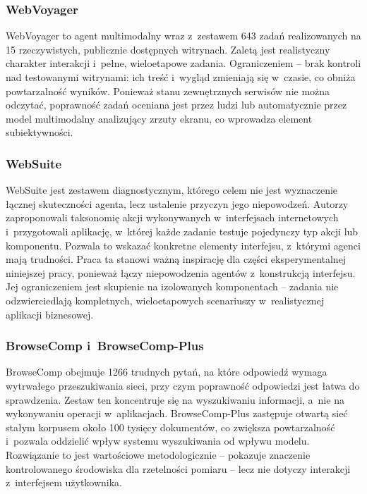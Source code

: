 \subsubsection{WebVoyager}
WebVoyager \citep{he2024webvoyager} to agent multimodalny wraz z~zestawem 643 zadań realizowanych na 15 rzeczywistych, publicznie dostępnych witrynach. Zaletą jest realistyczny charakter interakcji i~pełne, wieloetapowe zadania. Ograniczeniem -- brak kontroli nad testowanymi witrynami: ich treść i~wygląd zmieniają się w~czasie, co obniża powtarzalność wyników. Ponieważ stanu zewnętrznych serwisów nie można odczytać, poprawność zadań oceniana jest przez ludzi lub automatycznie przez model multimodalny analizujący zrzuty ekranu, co wprowadza element subiektywności.

\subsubsection{WebSuite}
WebSuite \citep{li2024websuite} jest zestawem diagnostycznym, którego celem nie jest wyznaczenie łącznej skuteczności agenta, lecz ustalenie przyczyn jego niepowodzeń. Autorzy zaproponowali taksonomię akcji wykonywanych w~interfejsach internetowych i~przygotowali aplikację, w~której każde zadanie testuje pojedynczy typ akcji lub komponentu. Pozwala to wskazać konkretne elementy interfejsu, z~którymi agenci mają trudności. Praca ta stanowi ważną inspirację dla części eksperymentalnej niniejszej pracy, ponieważ łączy niepowodzenia agentów z~konstrukcją interfejsu. Jej ograniczeniem jest skupienie na izolowanych komponentach -- zadania nie odzwierciedlają kompletnych, wieloetapowych scenariuszy w~realistycznej aplikacji biznesowej.

\subsubsection{BrowseComp i~BrowseComp-Plus}
BrowseComp \citep{wei2025browsecomp} obejmuje 1266 trudnych pytań, na które odpowiedź wymaga wytrwałego przeszukiwania sieci, przy czym poprawność odpowiedzi jest łatwa do sprawdzenia. Zestaw ten koncentruje się na wyszukiwaniu informacji, a~nie na wykonywaniu operacji w~aplikacjach. BrowseComp-Plus \citep{chen2025browsecompplus} zastępuje otwartą sieć stałym korpusem około 100 tysięcy dokumentów, co zwiększa powtarzalność i~pozwala oddzielić wpływ systemu wyszukiwania od wpływu modelu. Rozwiązanie to jest wartościowe metodologicznie -- pokazuje znaczenie kontrolowanego środowiska dla rzetelności pomiaru -- lecz nie dotyczy interakcji z~interfejsem użytkownika.

